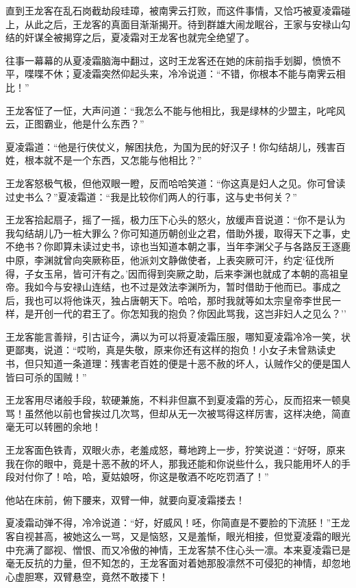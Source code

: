 \documentclass[12pt,oneside]{book}
\begin{document}
直到王龙客在乱石岗截劫段珪璋，被南霁云打败，而这件事情，又恰巧被夏凌霜碰上，从此之后，王龙客的真面目渐渐揭开。待到群雄大闹龙眠谷，王家与安禄山勾结的奸谋全被揭穿之后，夏凌霜对王龙客也就完全绝望了。

往事一幕幕的从夏凌霜脑海中翻过，这时王龙客还在她的床前指手划脚，愤愤不平，喋喋不休；夏凌霜突然仰起头来，冷冷说道：``不错，你根本不能与南霁云相比！''

王龙客怔了一怔，大声问道：``我怎么不能与他相比，我是绿林的少盟主，叱咤风云，正图霸业，他是什么东西？''

夏凌霜道：``他是行侠仗义，解困扶危，为国为民的好汉子！你勾结胡儿，残害百姓，根本就不是一个东西，又怎能与他相比？''

王龙客怒极气极，但他双眼一瞪，反而哈哈笑道：``你这真是妇人之见。你可曾读过史书么？''夏凌霜道：``我是比较你们两人的行事，这与史书何关？''

王龙客拾起扇子，摇了一摇，极力压下心头的怒火，放缓声音说道：``你不是认为我勾结胡儿乃一桩大罪么？你可知道历朝创业之君，借助外援，取得天下之事，史不绝书？你即算未读过史书，谅也当知道本朝之事，当年李渊父子与各路反王逐鹿中原，李渊就曾向突厥称臣，他派刘文静做使者，上表突厥可汗，约定`征伐所得，子女玉帛，皆可汗有之。'因而得到突厥之助，后来李渊也就成了本朝的高祖皇帝。我如今与安禄山连结，也不过是效法李渊所为，暂时借助于他而已。事成之后，我也可以将他诛灭，独占唐朝天下。哈哈，那时我就等如太宗皇帝李世民一样，是开创一代的君王了。你怎知我的抱负？你因此骂我，这岂非妇人之见么？''

王龙客能言善辩，引古证今，满以为可以将夏凌霜压服，哪知夏凌霜冷冷一笑，状更鄙夷，说道：``哎哟，真是失敬，原来你还有这样的抱负！小女子未曾熟读史书，但只知道一条道理：残害老百姓的便是十恶不赦的坏人，认贼作父的便是国人皆曰可杀的国贼！''

王龙客用尽诸般手段，软硬兼施，不料非但赢不到夏凌霜的芳心，反而招来一顿臭骂！虽然他以前也曾挨过几次骂，但却从无一次被骂得这样厉害，这样决绝，简直毫无可以转圈的余地！

王龙客面色铁青，双眼火赤，老羞成怒，蓦地跨上一步，狞笑说道：``好呀，原来我在你的眼中，竟是十恶不赦的坏人，那我还能和你说些什么，我只能用坏人的手段对付你了！哈，哈，夏姑娘呀，你这是敬酒不吃吃罚酒了！''

他站在床前，俯下腰来，双臂一伸，就要向夏凌霜搂去！

夏凌霜动弹不得，冷冷说道：``好，好威风！呸，你简直是不要脸的下流胚！''王龙客自视甚高，被她这么一骂，又是恼怒，又是羞惭，眼光相接，但觉夏凌霜的眼光中充满了鄙视、憎恨、而又冷傲的神情，王龙客禁不住心头一凛。本来夏凌霜已是毫无反抗的力量，但不知怎的，王龙客面对着她那股凛然不可侵犯的神情，却忽地心虚胆寒，双臂悬空，竟然不敢搂下！
\end{document}
